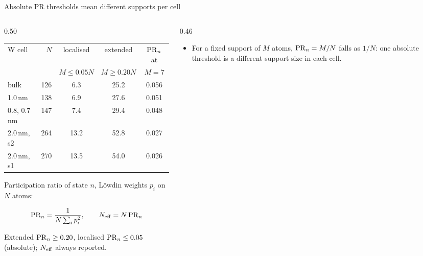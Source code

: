 \begin{frame}{Absolute PR thresholds mean different supports per cell}
  \elevenTop\elevendense
  \begin{columns}[T,onlytextwidth]
    \begin{column}{0.50\textwidth}
      \begingroup\scriptsize
      \setlength{\tabcolsep}{4.5pt}
      \renewcommand{\arraystretch}{1.05}
      \begin{tabular}{@{}l r c c c@{}}
        \toprule
        W cell & $N$ & localised & extended & $\mathrm{PR}_n$ at \\
               &     & $M \le 0.05N$ & $M \ge 0.20N$ & $M = 7$ \\
        \midrule
        bulk & 126 & 6.3 & 25.2 & 0.056 \\
        1.0\,nm & 138 & 6.9 & 27.6 & 0.051 \\
        0.8, 0.7\,nm & 147 & 7.4 & 29.4 & 0.048 \\
        2.0\,nm, s2 & 264 & 13.2 & 52.8 & 0.027 \\
        2.0\,nm, s1 & 270 & 13.5 & 54.0 & 0.026 \\
        \bottomrule
      \end{tabular}\par\endgroup
      \vspace{0.6mm}
      {\footnotesize Participation ratio of state $n$, L\"owdin weights $p_i$ on $N$
        atoms:\par}
      \vspace{-1.6mm}
      {\footnotesize\[ \mathrm{PR}_n = \frac{1}{N\sum_i p_i^2}, \qquad N_{\mathrm{eff}} = N\,\mathrm{PR}_n \]\par}
      \vspace{-1.2mm}
      {\scriptsize Extended $\mathrm{PR}_n \ge 0.20$, localised $\mathrm{PR}_n \le 0.05$ (absolute); $N_{\mathrm{eff}}$ always reported.\par}
    \end{column}
    \begin{column}{0.46\textwidth}
      \begin{itemize}
        \item For a fixed support of $M$ atoms, $\mathrm{PR}_n = M/N$ falls as $1/N$: one absolute threshold is a different
          support size in each cell.

\end{itemize}
\end{column}
\end{columns}
\end{frame}
